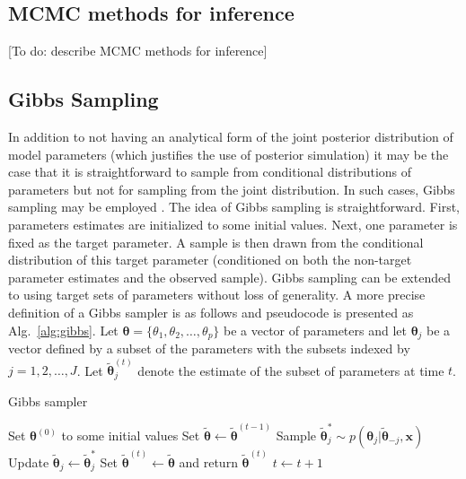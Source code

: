 \begin{DoubleSpace*}
\section{MCMC methods for inference}
[To do: describe MCMC methods for inference]

\subsection{Gibbs Sampling}
In addition to not having an analytical form of the joint posterior distribution of model parameters (which justifies the use of posterior simulation) it may be the case that it is straightforward to sample from conditional distributions of parameters but not for sampling from the joint distribution. In such cases, Gibbs sampling may be employed \cite{gelman2004,hoff2009}. The idea of Gibbs sampling is straightforward. First, parameters estimates are initialized to some initial values. Next, one parameter is fixed as the target parameter. A sample is then drawn from the conditional distribution of this target parameter (conditioned on both the non-target parameter estimates and the observed sample). Gibbs sampling can be extended to using target sets of parameters without loss of generality. A more precise definition of a Gibbs sampler is as follows and pseudocode is presented as Alg.~\ref{alg:gibbs}. Let $\boldsymbol{\theta}=\{\theta_1, \theta_2, \hdots,  \theta_p \}$ be a vector of parameters and let $\boldsymbol{\theta}_j$ be a vector defined by a subset of the parameters with the subsets indexed by $j=1, 2, \hdots, J$. Let $\tilde{\boldsymbol{\theta}}_j^{(t)}$ denote the estimate of the subset of parameters at time $t$. 

\begin{algorithm}
	\caption{Gibbs sampler
		\label{alg:gibbs}}
\begin{algorithmic}[1]
	\STATE Set $\boldsymbol{\theta}^{(0)}$ to some initial values
		\STATE Set $\tilde{\boldsymbol{\theta}} \leftarrow \tilde{\boldsymbol{\theta}}^{(t-1)}$
			\STATE Sample $\tilde{\boldsymbol{\theta}}_j^{*}\sim p \left(\boldsymbol{\theta}_j|\tilde{\boldsymbol{\theta}}_{-j}, \textbf{x} \right)$
			\STATE Update $\tilde{\boldsymbol{\theta}}_j \leftarrow \tilde{\boldsymbol{\theta}}_j^{*}$
		\ENDFOR
		\STATE Set $\tilde{\boldsymbol{\theta}}^{(t)} \leftarrow \tilde{\boldsymbol{\theta}}$ and return $\tilde{\boldsymbol{\theta}}^{(t)} $
		\STATE $t \leftarrow t+1$
	\ENDWHILE
\end{algorithmic}
\end{algorithm} 


\end{DoubleSpace*}
